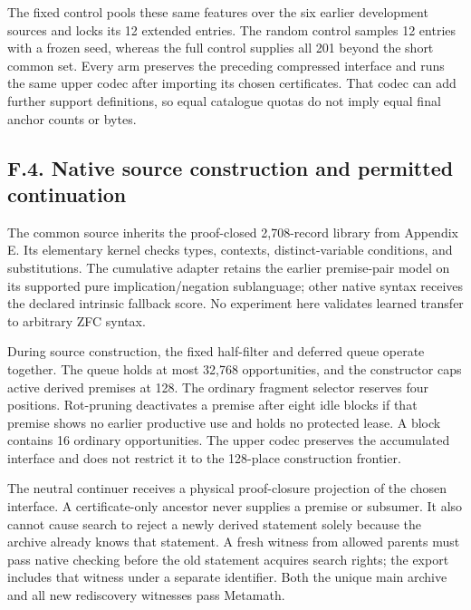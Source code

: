 \documentclass[pdflatex,sn-basic,Numbered]{sn-jnl}
\begin{document}
The fixed control pools these same features over the six earlier development sources and locks its 12 extended entries. The random control samples 12 entries with a frozen seed, whereas the full control supplies all 201 beyond the short common set. Every arm preserves the preceding compressed interface and runs the same upper codec after importing its chosen certificates. That codec can add further support definitions, so equal catalogue quotas do not imply equal final anchor counts or bytes.

\subsection*{F.4. Native source construction and permitted continuation}\label{f.4.-native-source-construction-and-permitted-continuation}

The common source inherits the proof-closed 2,708-record library from Appendix E. Its elementary kernel checks types, contexts, distinct-variable conditions, and substitutions. The cumulative adapter retains the earlier premise-pair model on its supported pure implication/negation sublanguage; other native syntax receives the declared intrinsic fallback score. No experiment here validates learned transfer to arbitrary ZFC syntax.

During source construction, the fixed half-filter and deferred queue operate together. The queue holds at most 32,768 opportunities, and the constructor caps active derived premises at 128. The ordinary fragment selector reserves four positions. Rot-pruning deactivates a premise after eight idle blocks if that premise shows no earlier productive use and holds no protected lease. A block contains 16 ordinary opportunities. The upper codec preserves the accumulated interface and does not restrict it to the 128-place construction frontier.

The neutral continuer receives a physical proof-closure projection of the chosen interface. A certificate-only ancestor never supplies a premise or subsumer. It also cannot cause search to reject a newly derived statement solely because the archive already knows that statement. A fresh witness from allowed parents must pass native checking before the old statement acquires search rights; the export includes that witness under a separate identifier. Both the unique main archive and all new rediscovery witnesses pass Metamath.
\end{document}
